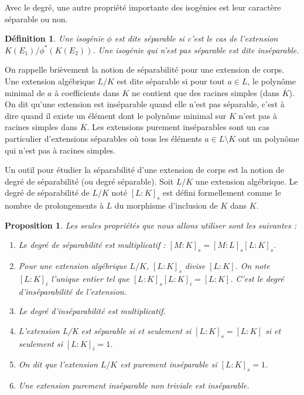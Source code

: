 \documentclass{article}
\theoremstyle{plain}%
\newtheorem{prop}[thm]{Proposition}
\newtheorem{deff}[thm]{Définition}
\theoremstyle{definition}%
\begin{document}
Avec le degré, une autre propriété importante des isogénies est leur caractère séparable ou non.

\begin{deff}
  Une isogénie $\phi$ est dite séparable si c'est le cas de l'extension $K(E_1) / \phi^*(K(E_2))$. Une isogénie qui n'est pas séparable est dite inséparable.
\end{deff}

On rappelle brièvement la notion de séparabilité pour une extension de corps. Une extension algébrique $L/K$ est dite séparable si pour tout $a\in L$, le polynôme minimal de $a$ à coefficients dans $K$ ne contient que des racines simples (dans $\overline{K}$). On dit qu'une extension est inséparable quand elle n'est pas séparable, c'est à dire quand il existe un élément dont le polynôme minimal sur $K$ n'est pas à racines simples dans $\overline{K}$. Les extensions purement inséparables sont un cas particulier d'extensions séparables où tous les éléments $a\in L \setminus K$ ont un polynôme qui n'est pas à racines simples.

Un outil pour étudier la séparabilité d’une extension de corps est la notion de degré de séparabilité (ou
degré séparable). Soit $L/K$ une extension algébrique. Le degré de séparabilité de $L/K$ noté  $[L : K]_s$ est défini
formellement comme le nombre de prolongements à $L$ du morphisme d’inclusion de $K$ dans $K$. 

\begin{prop}
Les seules
propriétés que nous allons utiliser sont les suivantes :
  \begin{enumerate}
    \item Le degré de séparabilité est multiplicatif : $[M : K]_s = [M : L]_s [L : K]_s$.
    \item Pour une extension algébrique $L/K$, $[L : K]_s$ divise $[L : K]$. On note $[L:K]_i$ l'unique entier tel que $[L:K]_s[L:K]_i=[L:K]$. C'est le degré d'inséparabilité de l'extension. 
    \item Le degré d'inséparabilité est multiplicatif.
    \item L’extension L/K est séparable si et seulement si $[L : K]_s = [L : K]$ si et seulement si $[L:K]_i = 1$.
    \item On dit que l'extension $L/K$ est purement inséparable si $[L:K]_s = 1$.
    \item Une extension purement inséparable non triviale est inséparable.
  \end{enumerate}
\end{prop}
\end{document}

